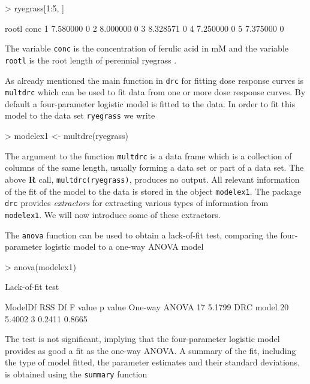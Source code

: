\documentclass[a4paper]{article}
\begin{document}
\begin{Schunk}
\begin{Sinput}
> ryegrass[1:5, ]
\end{Sinput}
\begin{Soutput}
     rootl conc
1 7.580000    0
2 8.000000    0
3 8.328571    0
4 7.250000    0
5 7.375000    0
\end{Soutput}
\end{Schunk}
The variable \verb+conc+ is the concentration of ferulic acid in mM and the variable \verb+rootl+ is the root length of 
perennial ryegrass \citep{inderjit&streibig&olofsdotter:2002}.

As already mentioned the main function in \verb+drc+ for fitting dose response curves is \verb+multdrc+ which 
can be used to fit data from one or more dose response curves. By default a four-parameter logistic model is 
fitted to the data. In order to fit this model to the data set \verb+ryegrass+ we write 

\begin{Schunk}
\begin{Sinput}
> modelex1 <- multdrc(ryegrass)
\end{Sinput}
\end{Schunk}
The argument to the function \verb+multdrc+ is a data frame which is a collection of columns of the same length, 
usually forming a data set or part of a data set. The above \textbf{R} call, \verb+multdrc(ryegrass)+, produces 
no output. All relevant information of the fit of the model to the data is stored in the object \verb+modelex1+. 
The package \verb+drc+ provides \emph{extractors} for extracting various types of information from 
\verb+modelex1+. We will now introduce some of these extractors.

The \verb+anova+ function can be used to obtain a lack-of-fit test, comparing the four-parameter logistic model to a one-way ANOVA model

\begin{Schunk}
\begin{Sinput}
> anova(modelex1)
\end{Sinput}
\begin{Soutput}
Lack-of-fit test

              ModelDf    RSS Df F value p value
One-way ANOVA      17 5.1799                   
DRC model          20 5.4002  3  0.2411  0.8665
\end{Soutput}
\end{Schunk}
The test is not significant, implying that the four-parameter logistic model provides as good a fit as the one-way ANOVA.
A summary of the fit, including the type of model fitted, the parameter estimates and their
standard deviations, is obtained using the \verb+summary+ function
\end{document}
